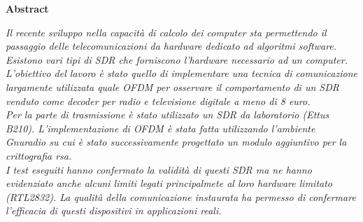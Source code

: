 \thispagestyle{empty}

\begin{center}
  {\bf \Huge Abstract}
\end{center}

\vspace{4cm}


\emph{
	Il recente sviluppo nella capacità di calcolo dei computer sta permettendo il passaggio delle telecomunicazioni da hardware dedicato ad algoritmi software. Esistono vari tipi di SDR che forniscono l'hardware necessario ad un computer.\\ L'obiettivo del lavoro è stato quello di implementare una tecnica di comunicazione largamente utilizzata quale OFDM per osservare il comportamento di un SDR venduto come decoder per radio e televisione digitale a meno di 8 euro.\\ Per la parte di trasmissione è stato utilizzato un SDR da laboratorio (Ettus B210). L'implementazione di OFDM è stata fatta utilizzando l'ambiente Gnuradio su cui è stato successivamente progettato un modulo aggiuntivo per la crittografia rsa.\\ I test eseguiti hanno confermato la validità di questi SDR ma ne hanno evidenziato anche alcuni limiti legati principalmete al loro hardware limitato (RTL2832). La qualità della comunicazione instaurata ha permesso di confermare l'efficacia di questi dispositivi in applicazioni reali.}
